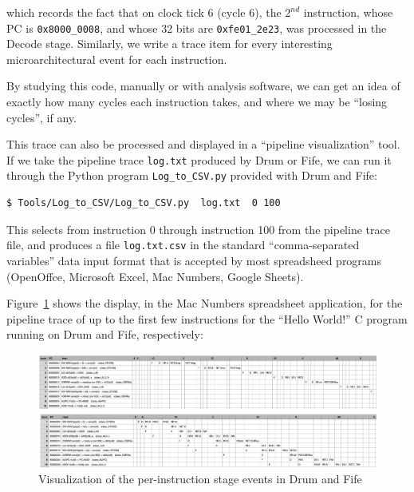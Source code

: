 which records the fact that on clock tick 6 (cycle 6), the $2^{nd}$
instruction, whose PC is \verb|0x8000_0008|, and whose 32 bits are
\verb|0xfe01_2e23|, was processed in the Decode stage.  Similarly, we
write a trace item for every interesting microarchitectural event for
each instruction.

By studying this code, manually or with analysis software, we can get
an idea of exactly how many cycles each instruction takes, and where
we may be ``losing cycles'', if any.

This trace can also be processed and displayed in a ``pipeline
visualization'' tool.  If we take the pipeline trace \verb|log.txt|
produced by Drum or Fife, we can run it through the Python program
\verb|Log_to_CSV.py| provided with Drum and Fife:

{\footnotesize
\begin{Verbatim}[frame=single, label=log.txt]
  $ Tools/Log_to_CSV/Log_to_CSV.py  log.txt  0 100
\end{Verbatim}
}

This selects from instruction 0 through instruction 100 from the
pipeline trace file, and produces a file \verb|log.txt.csv| in the
standard ``comma-separated variables'' data input format that is
accepted by most spreadsheed programs (OpenOffce, Microsoft Excel, Mac
Numbers, Google Sheets).

Figure~\ref{Fig_PipeViz} shows the display, in the Mac Numbers
spreadsheet application, for the pipeline trace of up to the first few
instructions for the ``Hello World!'' C program running on Drum and
Fife, respectively:
\begin{figure}[htbp]
  \centerline{\includegraphics[width=6in,angle=0]{Figures/Fig_PipeViz_Drum}}
  \vspace*{1ex}
  \centerline{\includegraphics[width=6in,angle=0]{Figures/Fig_PipeViz_Fife}}
  \caption{\label{Fig_PipeViz}
           Visualization of the per-instruction stage events in Drum and Fife}
\end{figure}

